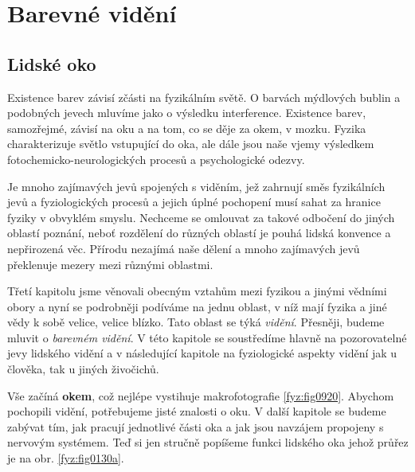 \setchaptertoc
\chapter{Barevné vidění}\label{fyz:IchapXXXV}

  \section{Lidské oko}\label{fyz:IchapXXXVsecI}
    Existence barev závisí zčásti na fyzikálním světě. O barvách mýdlových bublin a podobných jevech
    mluvíme jako o výsledku interference. Existence barev, samozřejmé, závisí na oku a na tom, co se
    děje za okem, v mozku. Fyzika charakterizuje světlo vstupující do oka, ale dále jsou naše vjemy
    výsledkem fotochemicko-neurologických procesů a psychologické odezvy.
    
    Je mnoho zajímavých jevů spojených s viděním, jež zahrnují směs fyzikálních jevů a
    fyziologických procesů a jejich úplné pochopení musí sahat za hranice fyziky v obvyklém smyslu.
    Nechceme se omlouvat za takové odbočení do jiných oblastí poznání, neboť rozdělení do různých
    oblastí je pouhá lidská konvence a nepřirozená věc. Přírodu nezajímá naše dělení a mnoho
    zajímavých jevů překlenuje mezery mezi různými oblastmi.
   
    Třetí kapitolu jsme věnovali obecným vztahům mezi fyzikou a jinými vědními obory a nyní se 
    podrobněji podíváme na jednu oblast, v níž mají fyzika a jiné vědy k sobě velice, velice 
    blízko. Tato oblast se týká \emph{vidění}. Přesněji, budeme mluvit o \emph{barevném vidění}. V 
    této kapitole se soustředíme hlavně na pozorovatelné jevy lidského vidění a v následující 
    kapitole na fyziologické aspekty vidění jak u člověka, tak u jiných živočichů.
    
    Vše začíná \textbf{okem}, což nejlépe vystihuje makrofotografie \ref{fyz:fig0920}. Abychom
    pochopili vidění, potřebujeme jisté znalosti o oku. V další kapitole se budeme zabývat tím, jak
    pracují jednotlivé části oka a jak jsou navzájem propojeny s nervovým systémem. Teď si jen
    stručně popíšeme funkci lidského oka jehož průřez je na obr. \ref{fyz:fig0130a}.

